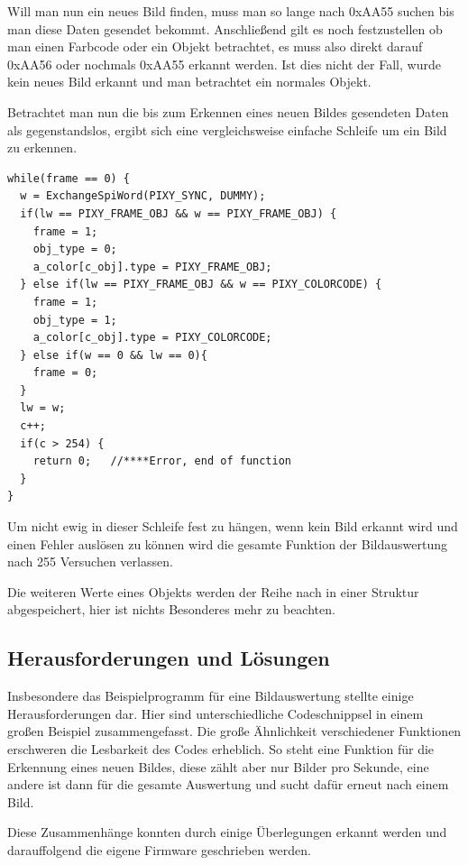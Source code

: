     Will man nun ein neues Bild finden, muss man so lange nach 0xAA55 suchen bis man diese Daten gesendet bekommt.
    Anschließend gilt es noch festzustellen ob man einen Farbcode oder ein Objekt betrachtet,
    es muss also direkt darauf 0xAA56 oder nochmals 0xAA55 erkannt werden. Ist dies nicht der Fall, wurde kein neues Bild erkannt und man betrachtet ein normales Objekt.

    Betrachtet man nun die bis zum Erkennen eines neuen Bildes gesendeten Daten als gegenstandslos, ergibt sich eine vergleichsweise einfache Schleife um ein Bild zu erkennen.

    \lstset{language = c}
    \begin{lstlisting}
while(frame == 0) {
  w = ExchangeSpiWord(PIXY_SYNC, DUMMY);
  if(lw == PIXY_FRAME_OBJ && w == PIXY_FRAME_OBJ) {
    frame = 1;
    obj_type = 0;
    a_color[c_obj].type = PIXY_FRAME_OBJ;
  } else if(lw == PIXY_FRAME_OBJ && w == PIXY_COLORCODE) {
    frame = 1;
    obj_type = 1;
    a_color[c_obj].type = PIXY_COLORCODE;
  } else if(w == 0 && lw == 0){
    frame = 0;
  }
  lw = w;
  c++;
  if(c > 254) {
    return 0;	//****Error, end of function
  }
}
    \end{lstlisting}
    Um nicht ewig in dieser Schleife fest zu hängen, wenn kein Bild erkannt wird und einen Fehler auslösen zu können wird die gesamte Funktion der Bildauswertung
    nach 255 Versuchen verlassen.

    Die weiteren Werte eines Objekts werden der Reihe nach in einer \gls{Struktur} abgespeichert, hier ist nichts Besonderes mehr zu beachten.

  \subsection{Herausforderungen und Lösungen}
  Insbesondere das Beispielprogramm\cite{PIXY_Porting_Examplecode} für eine Bildauswertung stellte einige Herausforderungen dar. Hier sind unterschiedliche Codeschnippsel in einem
  großen Beispiel zusammengefasst. Die große Ähnlichkeit verschiedener Funktionen erschweren die Lesbarkeit des Codes erheblich. So steht eine Funktion für die Erkennung eines
  neuen Bildes, diese zählt aber nur Bilder pro Sekunde, eine andere ist dann für die gesamte Auswertung und sucht dafür erneut nach einem Bild.

  Diese Zusammenhänge konnten durch einige Überlegungen erkannt werden und darauffolgend die eigene Firmware geschrieben werden.

